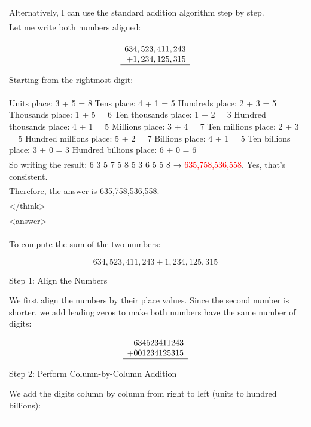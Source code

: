 \documentclass[11pt]{article}
\begin{document}
\begin{table}[htbp]
{\begin{tabular}{p{}}
    Alternatively, I can use the standard addition algorithm step by step.\\
    
    Let me write both numbers aligned:\\

    $$\begin{array}{r}
      634,523,411,243 \\
    +   1,234,125,315 \\
    \hline
    \end{array}$$
    
    Starting from the rightmost digit:\\
    
    Units place: 3 + 5 = 8
    Tens place: 4 + 1 = 5
    Hundreds place: 2 + 3 = 5
    Thousands place: 1 + 5 = 6
    Ten thousands place: 1 + 2 = 3
    Hundred thousands place: 4 + 1 = 5
    Millions place: 3 + 4 = 7
    Ten millions place: 2 + 3 = 5
    Hundred millions place: 5 + 2 = 7
    Billions place: 4 + 1 = 5
    Ten billions place: 3 + 0 = 3
    Hundred billions place: 6 + 0 = 6\\
    
    So writing the result: 6 3 5 7 5 8 5 3 6 5 5 8 → \textcolor{red}{635,758,536,558}. Yes, that's consistent.\\
    
    Therefore, the answer is 635,758,536,558.\\
    \textless /think\textgreater
    \\
    \textless answer\textgreater\\
    To compute the sum of the two numbers:

    \[
    634,\!523,\!411,\!243 + 1,\!234,\!125,\!315
    \]

    Step 1: Align the Numbers

    We first align the numbers by their place values. Since the second number is shorter, we add leading zeros to make both numbers have the same number of digits:

    $$\begin{array}{r}
      634523411243 \\
    +   001234125315 \\
    \hline
    \end{array}$$

    Step 2: Perform Column-by-Column Addition

    We add the digits column by column from right to left (units to hundred billions):


\end{tabular}}
\end{table}
\end{document}
